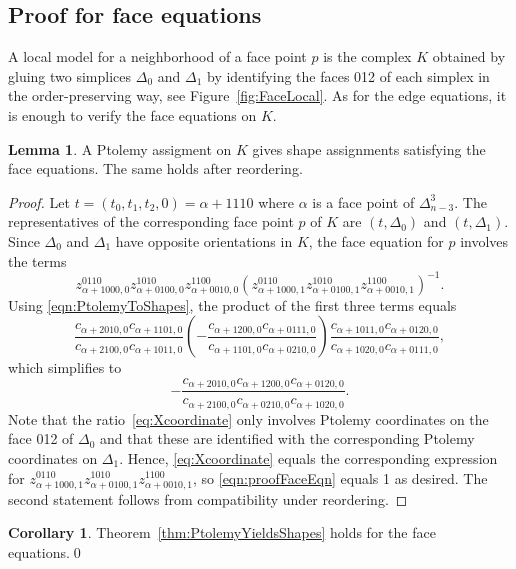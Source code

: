 \documentclass[12pt]{amsart}
\theoremstyle{definition}
\newtheorem{lemma}[theorem]{Lemma}
\newtheorem{corollary}[theorem]{Corollary}
\numberwithin{equation}{section}
\begin{document}
\subsection{Proof for face equations}\label{subsection:ProofForFaceEqn}
A local model for a neighborhood of a face point $p$ is the complex $K$ obtained by gluing two simplices $\Delta_0$ and $\Delta_1$ by identifying the faces 012 of each simplex in the order-preserving way, see Figure~\ref{fig:FaceLocal}. As for the edge equations, it is enough to verify the face equations on $K$. 
\begin{lemma}
A Ptolemy assigment on $K$ gives shape assignments satisfying the face equations. The same holds after reordering.
\end{lemma}
\begin{proof}
Let $t=(t_0,t_1,t_2,0)=\alpha+1110$ where $\alpha$ is a face point of $\Delta^3_{n-3}$. The representatives of the corresponding face point $p$ of $K$ are $(t,\Delta_0)$ and $(t,\Delta_1)$. Since $\Delta_0$ and $\Delta_1$ have opposite orientations in $K$, the face equation for $p$ involves the terms
\begin{equation}\label{eqn:proofFaceEqn}
z^{0110}_{\alpha+1000,0}z^{1010}_{\alpha+0100,0}z^{1100}_{\alpha+0010,0} \left(z^{0110}_{\alpha+1000,1} z^{1010}_{\alpha+0100,1} z^{1100}_{\alpha+0010,1}\right)^{-1}.
\end{equation}
Using \eqref{eqn:PtolemyToShapes}, the product of the first three terms equals
\begin{equation}\frac{c_{\alpha+2010,0}c_{\alpha+1101,0}}{c_{\alpha+2100,0}c_{\alpha+1011,0}} \left(-\frac{c_{\alpha+1200,0}c_{\alpha+0111,0}}{c_{\alpha+1101,0}c_{\alpha+0210,0}}\right) \frac{c_{\alpha+1011,0}c_{\alpha+0120,0}}{c_{\alpha+1020,0}c_{\alpha+0111,0}},
\end{equation}
which simplifies to
\begin{equation}\label{eq:Xcoordinate}
-\frac{c_{\alpha+2010,0} c_{\alpha+1200,0}c_{\alpha+0120,0}}{c_{\alpha+2100,0} c_{\alpha+0210,0} c_{\alpha+1020,0}}.
\end{equation}
Note that the ratio~\eqref{eq:Xcoordinate} only involves Ptolemy coordinates on the face 012 of $\Delta_0$ and that these are identified with the corresponding Ptolemy coordinates on $\Delta_1$. Hence, \eqref{eq:Xcoordinate} equals the corresponding expression for $z^{0110}_{\alpha+1000,1} z^{1010}_{\alpha+0100,1} z^{1100}_{\alpha+0010,1}$, so \eqref{eqn:proofFaceEqn} equals 1 as desired. The second statement follows from compatibility under reordering.
\end{proof}
\begin{corollary}
Theorem~\ref{thm:PtolemyYieldsShapes} holds for the face equations.\qed
\end{corollary}
\end{document}
